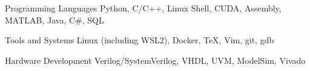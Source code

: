 
\begin{cvskills}

  \cvskill
    {Programming Languages} %
    {
      Python,
      C/C++,
      Linux Shell,
      CUDA,
      Assembly,
      MATLAB,
      Java,
      C\#,
      SQL
    } %

  \cvskill
    {Tools and Systems} %
    {
      Linux (including WSL2),
      Docker,
      TeX,
      Vim,
      git,
      gdb
    } %

  \cvskill
    {Hardware Development} %
    {
      Verilog/SystemVerilog,
      VHDL,
      UVM,
      ModelSim,
      Vivado
    } %

    
\end{cvskills}
